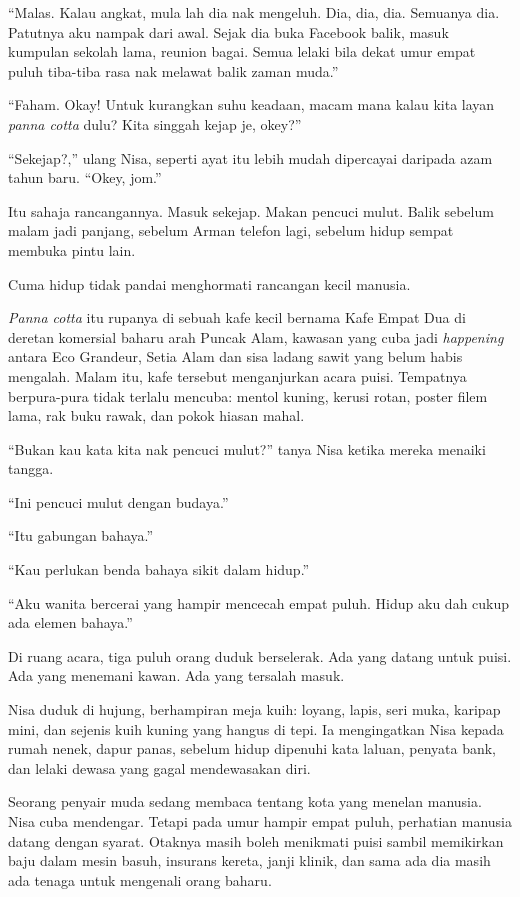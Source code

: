 \documentclass[
  11pt,
  a5paper,
  openany,
  oneside]{book}
\begin{document}
``Malas. Kalau angkat, mula lah dia nak mengeluh. Dia, dia, dia.
Semuanya dia. Patutnya aku nampak dari awal. Sejak dia buka Facebook
balik, masuk kumpulan sekolah lama, reunion bagai. Semua lelaki bila
dekat umur empat puluh tiba-tiba rasa nak melawat balik zaman muda.''

``Faham. Okay! Untuk kurangkan suhu keadaan, macam mana kalau kita layan
\emph{panna cotta} dulu? Kita singgah kejap je, okey?''

``Sekejap?,'' ulang Nisa, seperti ayat itu lebih mudah dipercayai
daripada azam tahun baru. ``Okey, jom.''

Itu sahaja rancangannya. Masuk sekejap. Makan pencuci mulut. Balik
sebelum malam jadi panjang, sebelum Arman telefon lagi, sebelum hidup
sempat membuka pintu lain.

Cuma hidup tidak pandai menghormati rancangan kecil manusia.

\emph{Panna cotta} itu rupanya di sebuah kafe kecil bernama Kafe Empat
Dua di deretan komersial baharu arah Puncak Alam, kawasan yang cuba jadi
\emph{happening} antara Eco Grandeur, Setia Alam dan sisa ladang sawit
yang belum habis mengalah. Malam itu, kafe tersebut menganjurkan acara
puisi. Tempatnya berpura-pura tidak terlalu mencuba: mentol kuning,
kerusi rotan, poster filem lama, rak buku rawak, dan pokok hiasan mahal.

``Bukan kau kata kita nak pencuci mulut?'' tanya Nisa ketika mereka
menaiki tangga.

``Ini pencuci mulut dengan budaya.''

``Itu gabungan bahaya.''

``Kau perlukan benda bahaya sikit dalam hidup.''

``Aku wanita bercerai yang hampir mencecah empat puluh. Hidup aku dah
cukup ada elemen bahaya.''

Di ruang acara, tiga puluh orang duduk berselerak. Ada yang datang untuk
puisi. Ada yang menemani kawan. Ada yang tersalah masuk.

Nisa duduk di hujung, berhampiran meja kuih: loyang, lapis, seri muka,
karipap mini, dan sejenis kuih kuning yang hangus di tepi. Ia
mengingatkan Nisa kepada rumah nenek, dapur panas, sebelum hidup
dipenuhi kata laluan, penyata bank, dan lelaki dewasa yang gagal
mendewasakan diri.

Seorang penyair muda sedang membaca tentang kota yang menelan manusia.
Nisa cuba mendengar. Tetapi pada umur hampir empat puluh, perhatian
manusia datang dengan syarat. Otaknya masih boleh menikmati puisi sambil
memikirkan baju dalam mesin basuh, insurans kereta, janji klinik, dan
sama ada dia masih ada tenaga untuk mengenali orang baharu.
\end{document}

